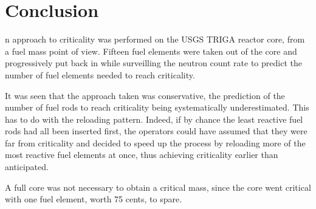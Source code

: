 %
%
\let\textcircled=\pgftextcircled
\chapter{Conclusion}
\label{chap:conclusion}

n approach to criticality was performed on the USGS TRIGA reactor core, from a fuel mass point of view. Fifteen fuel elements were taken out of the core and progressively put back in while surveilling the neutron count rate to predict the number of fuel elements needed to reach criticality.

It was seen that the approach taken was conservative, the prediction of the number of fuel rods to reach criticality being systematically underestimated. This has to do with the reloading pattern. Indeed, if by chance the least reactive fuel rods had all been inserted first, the operators could have assumed that they were far from criticality and decided to speed up the process by reloading more of the most reactive fuel elements at once, thus achieving criticality earlier than anticipated.

A full core was not necessary to obtain a critical mass, since the core went critical with one fuel element, worth 75 cents, to spare.


